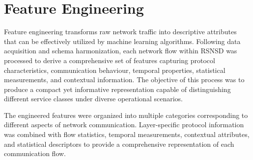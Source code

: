 \documentclass[12pt,a4paper]{report}
\begin{document}
	
	\section{Feature Engineering}
	\label{sec:feature_engineering}
	
	Feature engineering transforms raw network traffic into descriptive attributes that can be effectively utilized by machine learning algorithms. Following data acquisition and schema harmonization, each network flow within RSNSD was processed to derive a comprehensive set of features capturing protocol characteristics, communication behaviour, temporal properties, statistical measurements, and contextual information. The objective of this process was to produce a compact yet informative representation capable of distinguishing different service classes under diverse operational scenarios.
	
	The engineered features were organized into multiple categories corresponding to different aspects of network communication. Layer-specific protocol information was combined with flow statistics, temporal measurements, contextual attributes, and statistical descriptors to provide a comprehensive representation of each communication flow.
	

	
\end{document}
